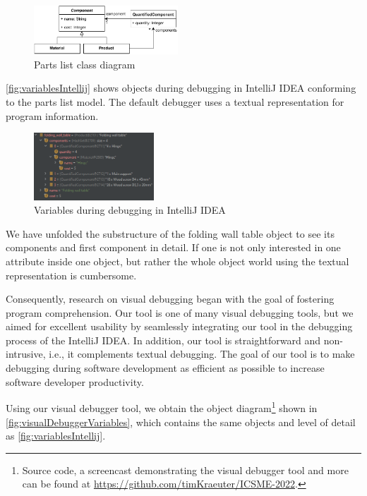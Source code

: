 \documentclass[conference]{IEEEtran}
\newcommand{\intellij}{IntelliJ IDEA}
\begin{document}
\begin{figure}[h]
    \centering
    \includegraphics[width=0.48\textwidth]{images/VD-parts list class diagram.pdf}
    \caption{Parts list class diagram}
    \label{fig:partsListModel}
\end{figure}

\autoref{fig:variablesIntellij} shows objects during debugging in \intellij{} conforming to the parts list model. 
The default debugger uses a textual representation for program information.

\begin{figure}[h]
    \centering
    \includegraphics[width=0.4\textwidth]{images/variables.png}
    \caption{Variables during debugging in \intellij}
    \label{fig:variablesIntellij}
\end{figure}

We have unfolded the substructure of the \textsf{folding wall table} object to see its components and first component in detail.
If one is not only interested in one attribute inside one object, but rather the whole object world using the textual representation is cumbersome.

Consequently, research on visual debugging began with the goal of fostering program comprehension.
Our tool is one of many visual debugging tools, but we aimed for excellent usability by seamlessly integrating our tool in the debugging process of the \intellij{}.
In addition, our tool is straightforward and non-intrusive, i.e., it complements textual debugging.
The goal of our tool is to make debugging during software development as efficient as possible to increase software developer productivity.

Using our visual debugger tool, we obtain the object diagram\footnote{\label{footnote:artifacts} Source code, a screencast demonstrating the visual debugger tool and more can be found at \url{https://github.com/timKraeuter/ICSME-2022}.} shown in \autoref{fig:visualDebuggerVariables}, which contains the same objects and level of detail as \autoref{fig:variablesIntellij}.
\end{document}
